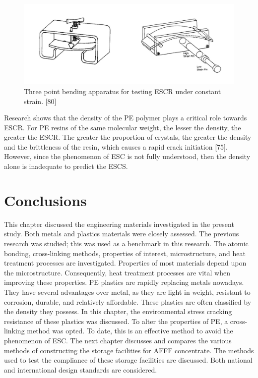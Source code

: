 \documentclass[12pt]{report}
\begin{document}
\begin{figure}[H]
    \centering
    \includegraphics[width=.8\textwidth]{three_point_bending_apparatus_for_testing_escr.jpg}
    \caption{Three point bending apparatus for testing ESCR under constant strain. [80]}
    \label{ch3:figure:bending_apparatus}
\end{figure}

Research shows that the density of the PE polymer plays a critical role towards ESCR. For PE resins of the same molecular weight, the lesser the density, the greater the ESCR. The greater the proportion of crystals, the greater the density and the brittleness of the resin, which causes a rapid crack initiation [75]. However, since the phenomenon of ESC is not fully understood, then the density alone is inadequate to predict the ESCS. 

\section{Conclusions}
This chapter discussed the engineering materials investigated in the present study. Both metals and plastics materials were closely assessed. The previous research was studied; this was used as a benchmark in this research. The atomic bonding, cross-linking methods, properties of interest, microstructure, and heat treatment processes are investigated. Properties of most materials depend upon the microstructure. Consequently, heat treatment processes are vital when improving these properties.
PE plastics are rapidly replacing metals nowadays. They have several advantages over metal, as they are light in weight, resistant to corrosion, durable, and relatively affordable. These plastics are often classified by the density they possess. In this chapter, the environmental stress cracking resistance of these plastics was discussed. To alter the properties of PE, a cross-linking method was opted. To date, this is an effective method to avoid the phenomenon of ESC.
The next chapter discusses and compares the various methods of constructing the storage facilities for AFFF concentrate. The methods used to test the compliance of these storage facilities are discussed. Both national and international design standards are considered.
\end{document}
